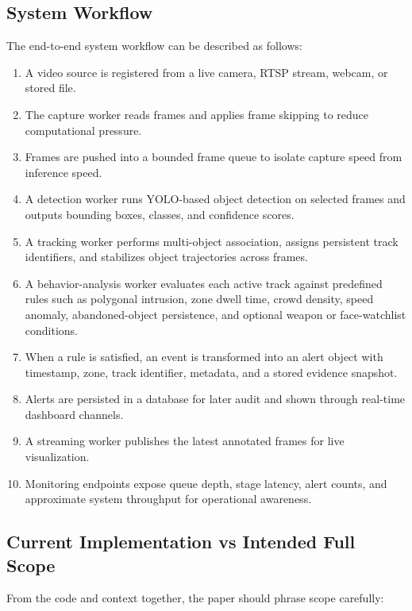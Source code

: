 \documentclass[11pt]{article}
\begin{document}
\subsection{System Workflow}
The end-to-end system workflow can be described as follows:

\begin{enumerate}
\item A video source is registered from a live camera, RTSP stream, webcam, or stored file.
\item The capture worker reads frames and applies frame skipping to reduce computational pressure.
\item Frames are pushed into a bounded frame queue to isolate capture speed from inference speed.
\item A detection worker runs YOLO-based object detection on selected frames and outputs bounding boxes, classes, and confidence scores.
\item A tracking worker performs multi-object association, assigns persistent track identifiers, and stabilizes object trajectories across frames.
\item A behavior-analysis worker evaluates each active track against predefined rules such as polygonal intrusion, zone dwell time, crowd density, speed anomaly, abandoned-object persistence, and optional weapon or face-watchlist conditions.
\item When a rule is satisfied, an event is transformed into an alert object with timestamp, zone, track identifier, metadata, and a stored evidence snapshot.
\item Alerts are persisted in a database for later audit and shown through real-time dashboard channels.
\item A streaming worker publishes the latest annotated frames for live visualization.
\item Monitoring endpoints expose queue depth, stage latency, alert counts, and approximate system throughput for operational awareness.
\end{enumerate}

\subsection{Current Implementation vs Intended Full Scope}
From the code and context together, the paper should phrase scope carefully:
\end{document}
